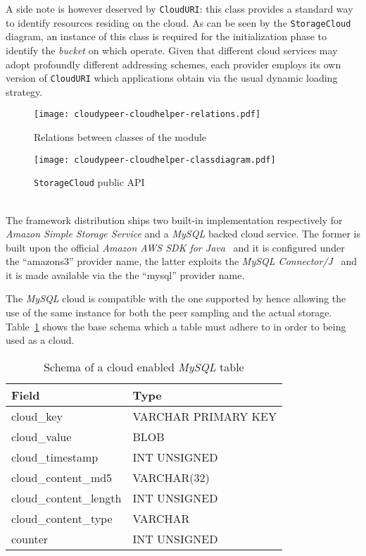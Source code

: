 A side note is however deserved by \texttt{CloudURI}: this
class provides a standard way to identify resources residing on the
cloud. As can be seen by the \texttt{StorageCloud} diagram, an
instance of this class is required for the initialization phase to
identify the \textit{bucket} on which operate. Given that different
cloud services may adopt profoundly different addressing schemes,
each \cloudhelper provider employs its own version of
\texttt{CloudURI} which applications obtain via the usual dynamic
loading strategy.

\begin{figure}[h!]
  \centering
  \texttt{[image: cloudypeer-cloudhelper-relations.pdf]}
  \caption{Relations between classes of the \cloudhelper module}
  \label{fig:cloudypeer-cloudhelper-relations}
\end{figure}

\begin{figure}[h!]
  \centering
  \texttt{[image: cloudypeer-cloudhelper-classdiagram.pdf]}
  \caption{\texttt{StorageCloud} public API}
  \label{fig:cloudypeer-cloudhelper-class}
\end{figure}

\ \\
The framework distribution ships two built-in \cloudhelper implementation
respectively for \textit{Amazon Simple Storage Service} and a
\textit{MySQL} backed cloud service. The former is built upon
the official \textit{Amazon AWS SDK for Java}~\cite{AWS4Java} and it is
configured under the ``amazons3'' provider name, the latter
exploits the \textit{MySQL Connector/J}~\cite{MySQLConnectorJava} and
it is made available via the the ``mysql'' provider name.

The \textit{MySQL} cloud is compatible with the one supported by
\grapes hence allowing the use of the same instance for both the
peer sampling and the actual storage. Table~\ref{tbl:mysql-cloud}
shows the base schema which a table must adhere to in order to being
used as a cloud.

\begin{table}[H]
  \centering
  \begin{tabular}{|l|l|}
  \hline
  Field & Type \\
  \hline
  \hline
  cloud\_key & VARCHAR PRIMARY KEY \\
  cloud\_value & BLOB \\
  cloud\_timestamp &  INT UNSIGNED \\
  cloud\_content\_md5 &  VARCHAR(32) \\
  cloud\_content\_length &  INT UNSIGNED \\
  cloud\_content\_type & VARCHAR \\
  counter & INT UNSIGNED \\
  \hline
  \end{tabular}
  \caption{Schema of a cloud enabled \textit{MySQL} table}
  \label{tbl:mysql-cloud}
\end{table}

